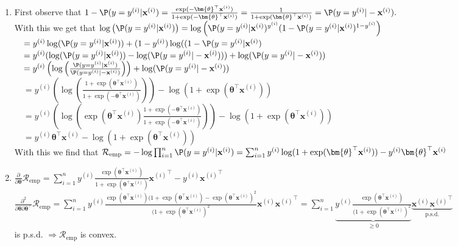 \begin{enumerate}
\item First observe that $1 - \P(y = y^{(i)}|\mathbf{x}^{(i)}) = \frac{\exp(-\bm{\theta}^\top \mathbf{x}^{(i)})}{1 + \exp(-\bm{\theta}^\top \mathbf{x}^{(i)})} = \frac{1}{1 + \exp(\bm{\theta}^\top \mathbf{x}^{(i)})} = \P(y = y^{(i)}|-\mathbf{x}^{(i)}).$ \\
With this we get that
$\log \left(\P(y = y^{(i)}|\mathbf{x}^{(i)})\right) = \log\left(\P(y = y^{(i)}|\mathbf{x}^{(i)})^{y^{(i)}}(1-\P(y = y^{(i)}|\mathbf{x}^{(i)})^{1-y^{(i)}}\right)$ \\
$\quad = y^{(i)}\log (\P(y = y^{(i)}|\mathbf{x}^{(i)})) + (1-y^{(i)})\log((1-\P(y = y^{(i)}|\mathbf{x}^{(i)})$ \\
$\quad = y^{(i)}(\log (\P(y = y^{(i)}|\mathbf{x}^{(i)})) - \log (\P(y = y^{(i)}|-\mathbf{x}^{(i)})) ) + \log(\P(y = y^{(i)}|-\mathbf{x}^{(i)}))$ \\
$\quad = y^{(i)}\left(\log\left(\frac{ \P(y = y^{(i)}|\mathbf{x}^{(i)})}{ \P(y = y^{(i)}|-\mathbf{x}^{(i)})}\right)\right) + \log(\P(y = y^{(i)}|-\mathbf{x}^{(i)}))$ \\
$\quad = y^{(i)}\left(\log\left(\frac{ 1 + \exp(\bm{\theta}^\top \mathbf{x}^{(i)})}{ 1 + \exp(-\bm{\theta}^\top \mathbf{x}^{(i)})}\right)\right) - \log(1 + \exp(\bm{\theta}^\top \mathbf{x}^{(i)}))$ \\
$\quad = y^{(i)}\left(\log\left(\exp(\bm{\theta}^\top \mathbf{x}^{(i)})\frac{ 1 + \exp(-\bm{\theta}^\top \mathbf{x}^{(i)})}{ 1 + \exp(-\bm{\theta}^\top \mathbf{x}^{(i)})}\right)\right) - \log(1 + \exp(\bm{\theta}^\top \mathbf{x}^{(i)}))$ \\
$\quad = y^{(i)}\bm{\theta}^\top \mathbf{x}^{(i)} - \log(1 + \exp(\bm{\theta}^\top \mathbf{x}^{(i)}))$ \\
With this we find that $\mathcal{R}_\text{emp} = -\log \prod^n_{i=1}\P(y = y^{(i)}|\mathbf{x}^{(i)}) = \sum^n_{i=1}y^{(i)} \log(1 + \exp(\bm{\theta}^\top \mathbf{x}^{(i)})) - y^{(i)}\bm{\theta}^\top \mathbf{x}^{(i)} $

\item $\frac{\partial}{\partial \bm{\theta}}\mathcal{R}_{\text{emp}} = \sum^n_{i=1}y^{(i)} \frac{\exp(\bm{\theta}^\top \mathbf{x}^{(i)})}{1 + \exp(\bm{\theta}^\top \mathbf{x}^{(i)})}{\mathbf{x}^{(i)}}^\top - y^{(i)}{\mathbf{x}^{(i)}}^\top$ \\
$\frac{\partial^2}{\partial \bm{\theta}\partial \bm{\theta}^\top}\mathcal{R}_{\text{emp}} = \sum^n_{i=1}y^{(i)} \frac{\exp(\bm{\theta}^\top \mathbf{x}^{(i)})(1 + \exp(\bm{\theta}^\top \mathbf{x}^{(i)}) - \exp(\bm{\theta}^\top \mathbf{x}^{(i)})^2}{(1 + \exp(\bm{\theta}^\top \mathbf{x}^{(i)})^2}\mathbf{x}^{(i)}{\mathbf{x}^{(i)}}^\top =  \sum^n_{i=1}\underbrace{y^{(i)} \frac{\exp(\bm{\theta}^\top \mathbf{x}^{(i)})}{(1 + \exp(\bm{\theta}^\top \mathbf{x}^{(i)})^2}}_{\geq 0}\underbrace{\mathbf{x}^{(i)}{\mathbf{x}^{(i)}}^\top}_{\text{p.s.d.}}$ \\
is p.s.d. $\Rightarrow \mathcal{R}_{\text{emp}}$ is convex.


\end{enumerate}

